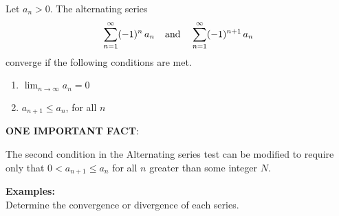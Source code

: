 \documentclass[addpoints, 12pt]{exam}
\begin{document}
\vspace{.07in}

\begin{tcolorbox}[title= THE ALTERNATING SERIES TEST,black,sharp corners,colback=white,colbacktitle=white,coltitle=black]

    Let $a_n>0$. The alternating series
    \[\sum_{n=1}^\infty(-1)^n\, a_n\hspace{.15in}\text{and}\hspace{.15in}\sum_{n=1}^\infty(-1)^{n+1}\,a_n\]
    converge if the following conditions are met.\\
    \begin{enumerate}
        \item $\displaystyle\lim_{n\to\infty}a_n=0$
        \item $\displaystyle a_{n+1}\le a_n$, for all $n$
    \end{enumerate}

\end{tcolorbox}
\vspace{.1in}
\noindent\textbf{ONE IMPORTANT FACT}:
\begin{questions}
    \question The second condition in the Alternating series test can be modified to require only that $0<a_{n+1}\le a_n$ for all $n$ greater than some integer $N$.
\end{questions}
\vspace{.1in}

\noindent\textbf{Examples:}\\
Determine the convergence or divergence of each series.

\newpage
\end{document}
